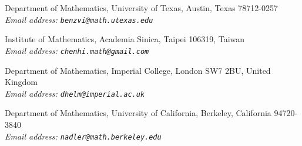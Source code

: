\medskip
\begin{center}
{\small Department of Mathematics, University of Texas, Austin, Texas 78712-0257\\[0.3em]
\itshape Email address: \texttt{benzvi@math.utexas.edu}}

\medskip
{\small Institute of Mathematics, Academia Sinica, Taipei 106319, Taiwan\\[0.3em]
\itshape Email address: \texttt{chenhi.math@gmail.com}}

\medskip
{\small Department of Mathematics, Imperial College, London SW7 2BU, United Kingdom\\[0.3em]
\itshape Email address: \texttt{dhelm@imperial.ac.uk}}

\medskip
{\small Department of Mathematics, University of California, Berkeley, California 94720-3840\\[0.3em]
\itshape Email address: \texttt{nadler@math.berkeley.edu}}
\end{center}

